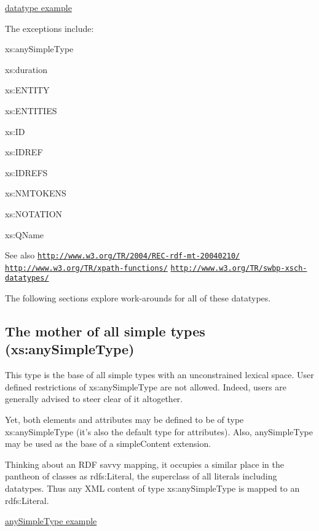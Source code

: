 \hyperlink{elementstring}{datatype example}

The exceptions include:
\begin{DoxyItemize}
\item xs:anySimpleType
\item xs:duration
\item xs:ENTITY
\item xs:ENTITIES
\item xs:ID
\item xs:IDREF
\item xs:IDREFS
\item xs:NMTOKENS
\item xs:NOTATION
\item xs:QName
\end{DoxyItemize}

\begin{DoxySeeAlso}{See also}
\href{http://www.w3.org/TR/2004/REC-rdf-mt-20040210/}{\tt http://www.w3.org/TR/2004/REC-\/rdf-\/mt-\/20040210/} \href{http://www.w3.org/TR/xpath-functions/}{\tt http://www.w3.org/TR/xpath-\/functions/} \href{http://www.w3.org/TR/swbp-xsch-datatypes/}{\tt http://www.w3.org/TR/swbp-\/xsch-\/datatypes/}
\end{DoxySeeAlso}
The following sections explore work-\/arounds for all of these datatypes.\hypertarget{datatypes_anySimpleType}{}\subsection{The mother of all simple types (xs:anySimpleType)}\label{datatypes_anySimpleType}
This type is the base of all simple types with an unconstrained lexical space. User defined restrictions of xs:anySimpleType are not allowed. Indeed, users are generally advised to steer clear of it altogether.

Yet, both elements and attributes may be defined to be of type xs:anySimpleType (it's also the default type for attributes). Also, anySimpleType may be used as the base of a simpleContent extension.

Thinking about an RDF savvy mapping, it occupies a similar place in the pantheon of classes as rdfs:Literal, the superclass of all literals including datatypes. Thus any XML content of type xs:anySimpleType is mapped to an rdfs:Literal.

\hyperlink{attributeanysimpletype}{anySimpleType example}

